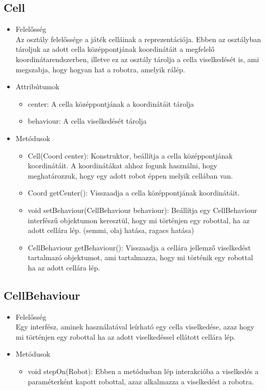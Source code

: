 
\subsection{Cell}
\begin{itemize}
\item Felelősség\\
Az osztály felelőssége a játék celláinak a reprezentációja. Ebben az osztályban tároljuk az adott cella középpontjának koordinátáit a megfelelő koordinátarendszerben, illetve ez az osztály tárolja a cella viselkedését is, ami megszabja, hogy hogyan hat a robotra, amelyik rálép.

\item Attribútumok
	\begin{itemize}
		\item center: A cella középpontjának a koordinátáit tárolja
		\item behaviour: A cella viselkedését tárolja
	\end{itemize}
\item Metódusok
	\begin{itemize}
		\item Cell(Coord center): Konstruktor, beállítja a cella középpontjának koordinátáit. A koordinátákat ahhoz fogunk használni, hogy meghatározzuk, hogy egy adott robot éppen melyik cellában van.
		\item Coord getCenter(): Visszaadja a cella középpontjának koordinátáit.
		\item void setBehaviour(CellBehaviour behaviour): Beállítja egy CellBehaviour interfészű objektumon keresztül, hogy mi történjen egy robottal, ha az adott cellára lép. (semmi, olaj hatása, ragacs hatása)
		\item CellBehaviour getBehaviour(): Visszaadja a cellára jellemző viselkedést tartalmazó objektumot, ami tartalmazza, hogy mi történik egy robottal ha az adott cellára lép.
	\end{itemize}
\end{itemize}

\subsection{CellBehaviour}
\begin{itemize}
	\item Felelősség\\
	Egy interfész, aminek használatával leírható egy cella viselkedése, azaz hogy mi történjen egy robottal ha az adott viselkedéssel ellátott cellára lép.
	\item Metódusok
	\begin{itemize}
		\item void stepOn(Robot): Ebben a metódusban lép interakcióba a viselkedés a paraméterként kapott robottal, azaz alkalmazza a viselkedést a robotra.
	\end{itemize}
\end{itemize}


